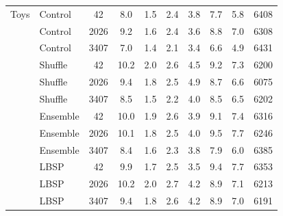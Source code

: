 \begin{longtable}{@{}llS[table-format=4.0,group-digits=false]S[table-format=2.1]S[table-format=2.1]S[table-format=2.1]S[table-format=2.1]S[table-format=2.1]S[table-format=2.1]S[table-format=5.0]@{}}
\midrule
Toys & Control & 42 & 8.0 & 1.5 & 2.4 & 3.8 & 7.7 & 5.8 & 6408\\ %
 & Control & 2026 & 9.2 & 1.6 & 2.4 & 3.6 & 8.8 & 7.0 & 6308\\ %
 & Control & 3407 & 7.0 & 1.4 & 2.1 & 3.4 & 6.6 & 4.9 & 6431\\ %
 & Shuffle & 42 & 10.2 & 2.0 & 2.6 & 4.5 & 9.2 & 7.3 & 6200\\ %
 & Shuffle & 2026 & 9.4 & 1.8 & 2.5 & 4.9 & 8.7 & 6.6 & 6075\\ %
 & Shuffle & 3407 & 8.5 & 1.5 & 2.2 & 4.0 & 8.5 & 6.5 & 6202\\ %
 & Ensemble & 42 & 10.0 & 1.9 & 2.6 & 3.9 & 9.1 & 7.4 & 6316\\ %
 & Ensemble & 2026 & 10.1 & 1.8 & 2.5 & 4.0 & 9.5 & 7.7 & 6246\\ %
 & Ensemble & 3407 & 8.4 & 1.6 & 2.3 & 3.8 & 7.9 & 6.0 & 6385\\ %
 & LBSP & 42 & 9.9 & 1.7 & 2.5 & 3.5 & 9.4 & 7.7 & 6353\\ %
 & LBSP & 2026 & 10.2 & 2.0 & 2.7 & 4.2 & 8.9 & 7.1 & 6213\\ %
 & LBSP & 3407 & 9.4 & 1.8 & 2.6 & 4.2 & 8.9 & 7.0 & 6191\\ %
\end{longtable}
\endgroup

